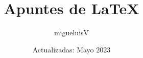 \documentclass[12pt]{article}
\title{Apuntes de LaTeX}
\author{migueluisV}
\date{Actualizadas: Mayo 2023}
\begin{document}
\renewcommand*\contentsname{Índice}
\renewcommand{\listtablename}{Índice de Tablas}
\renewcommand{\listfigurename}{Índice de Figuras}

\maketitle\newpage
\tableofcontents\newpage
\listoffigures\newpage
\listoftables\newpage








\newpage\printbibliography[heading=bibintoc, title={Referencias}]

\end{document}
